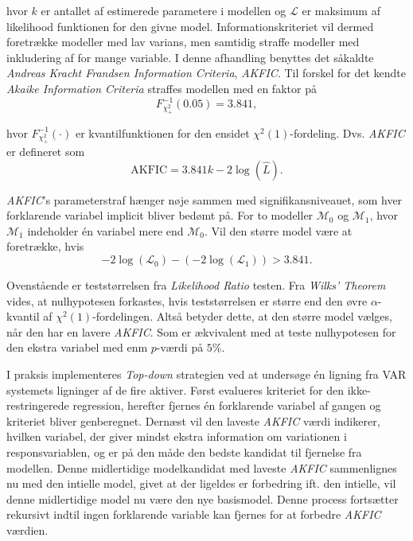 \documentclass[
  a4paper,
  oneside]{memoir}
\begin{document}
hvor \(k\) er antallet af estimerede parametere i modellen og \(\mathcal{L}\) er maksimum af likelihood funktionen for den givne model. Informationskriteriet vil dermed foretrække modeller med lav varians, men samtidig straffe modeller med inkludering af for mange variable. I denne afhandling benyttes det såkaldte \emph{Andreas Kracht Frandsen Information Criteria}, \emph{AKFIC}. Til forskel for det kendte \emph{Akaike Information Criteria} straffes modellen med en faktor på
\[F^{-1}_{\chi_{+}^2}(0.05)=3.841,\]

hvor \(F^{-1}_{\chi_{+}^2}(\cdot)\) er kvantilfunktionen for den ensidet \(\chi^2(1)\)-fordeling. Dvs. \emph{AKFIC} er defineret som
\[\text{AKFIC}=3.841 k-2\log(\hat{L}).\]

\emph{AKFIC}'s parameterstraf hænger nøje sammen med signifikansniveauet, som hver forklarende variabel implicit bliver bedømt på. For to modeller \(\mathcal{M}_0\) og \(\mathcal{M}_1\), hvor \(\mathcal{M}_1\) indeholder én variabel mere end \(\mathcal{M}_0\). Vil den større model være at foretrække, hvis
\[-2\log(\mathcal{L}_0)-(-2\log(\mathcal{L}_1))>3.841.\]

Ovenstående er teststørrelsen fra \emph{Likelihood Ratio} testen. Fra \emph{Wilks' Theorem} vides, at nulhypotesen forkastes, hvis teststørrelsen er større end den øvre \(\alpha\)-kvantil af \(\chi^2(1)\)-fordelingen. Altså betyder dette, at den større model vælges, når den har en lavere \emph{AKFIC}. Som er ækvivalent med at teste nulhypotesen for den ekstra variabel med enm \(p\)-værdi på \(5\%\).

I praksis implementeres \emph{Top-down} strategien ved at undersøge én ligning fra VAR systemets ligninger af de fire aktiver. Først evalueres kriteriet for den ikke-restringerede regression, herefter fjernes én forklarende variabel af gangen og kriteriet bliver genberegnet. Dernæst vil den laveste \emph{AKFIC} værdi indikerer, hvilken variabel, der giver mindst ekstra information om variationen i responsvariablen, og er på den måde den bedste kandidat til fjernelse fra modellen. Denne midlertidige modelkandidat med laveste \emph{AKFIC} sammenlignes nu med den intielle model, givet at der ligeldes er forbedring ift. den intielle, vil denne midlertidige model nu være den nye basismodel. Denne process fortsætter rekursivt indtil ingen forklarende variable kan fjernes for at forbedre \emph{AKFIC} værdien.
\end{document}
